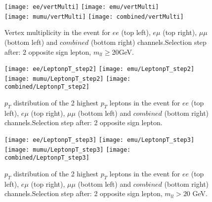 \documentclass[12pt, a4paper, titlepage]{article}
\begin{document}

\begin{figure}
  \texttt{[image: ee/vertMulti]}
  \texttt{[image: emu/vertMulti]}\\
  \texttt{[image: mumu/vertMulti]}
  \texttt{[image: combined/vertMulti]}
\caption{Vertex multiplicity in the event for $ee$ (top left), $e\mu$ (top right), $\mu\mu$ (bottom left) and $combined$ (bottom right) channels.\newline Selection step after: 2 opposite sign lepton, $m_{ll}\ge$20GeV.}
\end{figure}

\clearpage
\newpage


\begin{figure}
  \texttt{[image: ee/LeptonpT\_step2]}
  \texttt{[image: emu/LeptonpT\_step2]}\\
  \texttt{[image: mumu/LeptonpT\_step2]}
  \texttt{[image: combined/LeptonpT\_step2]}
\caption{$p_T$ distribution of the 2 highest $p_T$ leptons in the event for $ee$ (top left), $e\mu$ (top right), $\mu\mu$ (bottom left) and $combined$ (bottom right) channels.\newline Selection step after: 2 opposite sign lepton.}
\end{figure}

\clearpage
\newpage

\begin{figure}
  \texttt{[image: ee/LeptonpT\_step3]}
  \texttt{[image: emu/LeptonpT\_step3]}\\
  \texttt{[image: mumu/LeptonpT\_step3]}
  \texttt{[image: combined/LeptonpT\_step3]}
\caption{$p_T$ distribution of the 2 highest $p_T$ leptons in the event for $ee$ (top left), $e\mu$ (top right), $\mu\mu$ (bottom left) and $combined$ (bottom right) channels.\newline Selection step after: 2 opposite sign lepton, $m_{ll}>20$ GeV.}
\end{figure}
\end{document}
